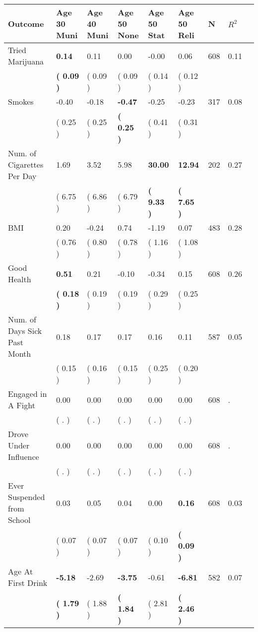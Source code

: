 \begin{tabular}{L{6.2cm} C{1.8cm} C{1.8cm} C{1.8cm} C{1.8cm} C{1.8cm} C{1.8cm} C{0.3cm} C{0.3cm}}
\toprule
 \textbf{Outcome} & \textbf{Age 30 Muni} & \textbf{Age 40 Muni} & \textbf{Age 50 None} & \textbf{Age 50 Stat} & \textbf{Age 50 Reli} & \textbf{N} & \textbf{$ R^2$} \\
\midrule
Tried Marijuana & \textbf{     0.14} &      0.11 &      0.00 &     -0.00 &      0.06  & 608 &       0.11 \\ 
 & \textbf{(     0.09 )} & (     0.09 ) & (     0.09 ) & (     0.14 ) & (     0.12 )  & \\
Smokes &     -0.40 &     -0.18 & \textbf{    -0.47} &     -0.25 &     -0.23  & 317 &       0.08 \\ 
 & (     0.25 ) & (     0.25 ) & \textbf{(     0.25 )} & (     0.41 ) & (     0.31 )  & \\
Num. of Cigarettes Per Day &      1.69 &      3.52 &      5.98 & \textbf{    30.00} & \textbf{    12.94}  & 202 &       0.27 \\ 
 & (     6.75 ) & (     6.86 ) & (     6.79 ) & \textbf{(     9.33 )} & \textbf{(     7.65 )}  & \\
BMI &      0.20 &     -0.24 &      0.74 &     -1.19 &      0.07  & 483 &       0.28 \\ 
 & (     0.76 ) & (     0.80 ) & (     0.78 ) & (     1.16 ) & (     1.08 )  & \\
Good Health & \textbf{     0.51} &      0.21 &     -0.10 &     -0.34 &      0.15  & 608 &       0.26 \\ 
 & \textbf{(     0.18 )} & (     0.19 ) & (     0.19 ) & (     0.29 ) & (     0.25 )  & \\
Num. of Days Sick Past Month &      0.18 &      0.17 &      0.17 &      0.16 &      0.11  & 587 &       0.05 \\ 
 & (     0.15 ) & (     0.16 ) & (     0.15 ) & (     0.25 ) & (     0.20 )  & \\
Engaged in A Fight &      0.00 &      0.00 &      0.00 &      0.00 &      0.00  & 608 &          . \\ 
 & (        . ) & (        . ) & (        . ) & (        . ) & (        . )  & \\
Drove Under Influence &      0.00 &      0.00 &      0.00 &      0.00 &      0.00  & 608 &          . \\ 
 & (        . ) & (        . ) & (        . ) & (        . ) & (        . )  & \\
Ever Suspended from School &      0.03 &      0.05 &      0.04 &      0.00 & \textbf{     0.16}  & 608 &       0.03 \\ 
 & (     0.07 ) & (     0.07 ) & (     0.07 ) & (     0.10 ) & \textbf{(     0.09 )}  & \\
Age At First Drink & \textbf{    -5.18} &     -2.69 & \textbf{    -3.75} &     -0.61 & \textbf{    -6.81}  & 582 &       0.07 \\ 
 & \textbf{(     1.79 )} & (     1.88 ) & \textbf{(     1.84 )} & (     2.81 ) & \textbf{(     2.46 )}  & \\
\bottomrule
\end{tabular}
